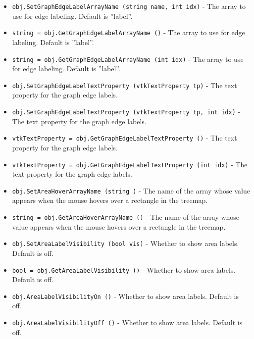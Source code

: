 \begin{itemize}
\item  \verb|obj.SetGraphEdgeLabelArrayName (string name, int idx)| -  The array to use for edge labeling.  Default is ''label''.

\item  \verb|string = obj.GetGraphEdgeLabelArrayName ()| -  The array to use for edge labeling.  Default is ''label''.

\item  \verb|string = obj.GetGraphEdgeLabelArrayName (int idx)| -  The array to use for edge labeling.  Default is ''label''.

\item  \verb|obj.SetGraphEdgeLabelTextProperty (vtkTextProperty tp)| -  The text property for the graph edge labels.

\item  \verb|obj.SetGraphEdgeLabelTextProperty (vtkTextProperty tp, int idx)| -  The text property for the graph edge labels.

\item  \verb|vtkTextProperty = obj.GetGraphEdgeLabelTextProperty ()| -  The text property for the graph edge labels.

\item  \verb|vtkTextProperty = obj.GetGraphEdgeLabelTextProperty (int idx)| -  The text property for the graph edge labels.

\item  \verb|obj.SetAreaHoverArrayName (string )| -  The name of the array whose value appears when the mouse hovers
 over a rectangle in the treemap.

\item  \verb|string = obj.GetAreaHoverArrayName ()| -  The name of the array whose value appears when the mouse hovers
 over a rectangle in the treemap.

\item  \verb|obj.SetAreaLabelVisibility (bool vis)| -  Whether to show area labels.  Default is off.

\item  \verb|bool = obj.GetAreaLabelVisibility ()| -  Whether to show area labels.  Default is off.

\item  \verb|obj.AreaLabelVisibilityOn ()| -  Whether to show area labels.  Default is off.

\item  \verb|obj.AreaLabelVisibilityOff ()| -  Whether to show area labels.  Default is off.


\end{itemize}
